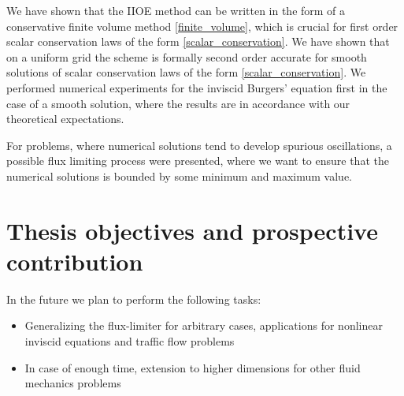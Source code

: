 \documentclass[../include.tex]{subfiles}
\begin{document}
We have shown that the IIOE method can be written in the form of a conservative finite volume method \eqref{finite_volume}, which is crucial for first order scalar conservation laws of the form \eqref{scalar_conservation}. We have shown that on a uniform grid the scheme is formally second order accurate for smooth solutions of scalar conservation laws of the form \eqref{scalar_conservation}. We performed numerical experiments for the inviscid Burgers' equation first in the case of a smooth solution, where the results are in accordance with our theoretical expectations.

For problems, where numerical solutions tend to develop spurious oscillations, a possible flux limiting process were presented, where we want to ensure that the numerical solutions is bounded by some minimum and maximum value. 
\chapter{Thesis objectives and prospective contribution}
In the future we plan to perform the following tasks:
\begin{itemize}
	\item Generalizing the flux-limiter for arbitrary cases, applications for nonlinear inviscid equations and traffic flow problems
	\item In case of enough time, extension to higher dimensions for other fluid mechanics problems
\end{itemize}
\end{document}
